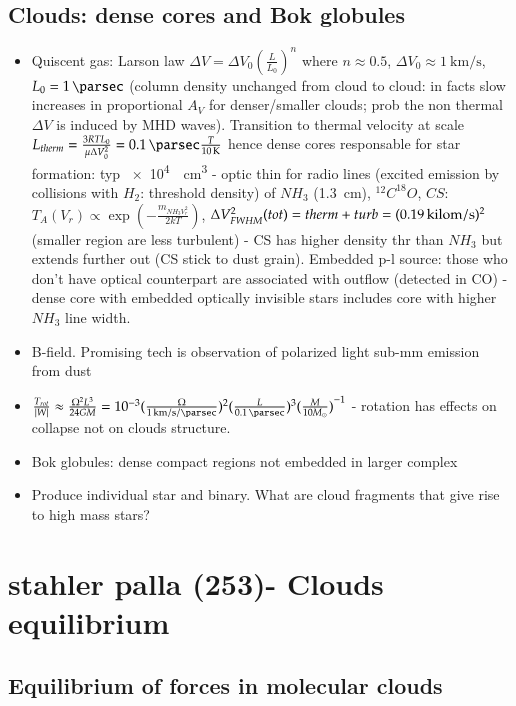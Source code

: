 \documentclass[main.tex]{subfiles}
\begin{document}
\section{Clouds: dense cores and Bok globules}
\begin{itemize}
\item Quiscent gas: Larson law $\Delta V=\Delta V_0(\frac{L}{L_0})^n$ where $n\approx0.5$, $\Delta V_0\approx\SI{1}{\kilo\meter\per\second}$, $L_0=\SI{1}{\parsec}$ (column density unchanged from cloud to cloud: in facts slow increases in proportional $A_V$ for denser/smaller clouds; prob the non thermal $\Delta V$ is induced by MHD waves). Transition to thermal velocity at scale $L_{therm}=\frac{3RTL_0}{\mu\Delta V_0^2}=\SI{0.1}{\parsec}\frac{T}{\SI{10}{\kelvin}}$ hence dense cores responsable for star formation: typ \SI{e4}{\per\cubic\cm} - optic thin for radio lines (excited emission by collisions with $H_2$: threshold density) of $NH_3$ (\SI{1.3}{\cm}), $^{12}C^{18}O$, $CS$: $T_A(V_r)\propto\exp{(-\frac{m_{NH_3V_r^2}}{2kT})}$, $\Delta V_{FWHM}^2(tot)=therm+turb=(\SI{0.19}{\\kilo\meter\per\second})^2$ (smaller region are less turbulent) - CS has higher density thr than $NH_3$ but extends further out (CS stick to dust grain). Embedded p-l source: those who don't have optical counterpart are associated with outflow (detected in CO) - dense core with embedded optically invisible stars includes core with higher $NH_3$ line width.
\item B-field. Promising tech is observation of polarized light sub-mm emission from dust
\item $\frac{T_{rot}}{|W|}\approx\frac{\Omega^2 L^3}{24GM}=\num{e-3}(\frac{\Omega}{\SI{1}{\kilo\meter\per\second\per\parsec}})^2(\frac{L}{\SI{0.1}{\parsec}})^3\invers{(\frac{M}{10\msun})}$ - rotation has effects on collapse not on clouds structure.
\item Bok globules: dense compact regions not embedded in larger complex
\item Produce individual star and binary. What are cloud fragments that give rise to high mass stars?
\end{itemize}

\chapter{stahler palla (253)- Clouds equilibrium}
\PartialToc

\section{Equilibrium of forces in molecular clouds}
\end{document}
